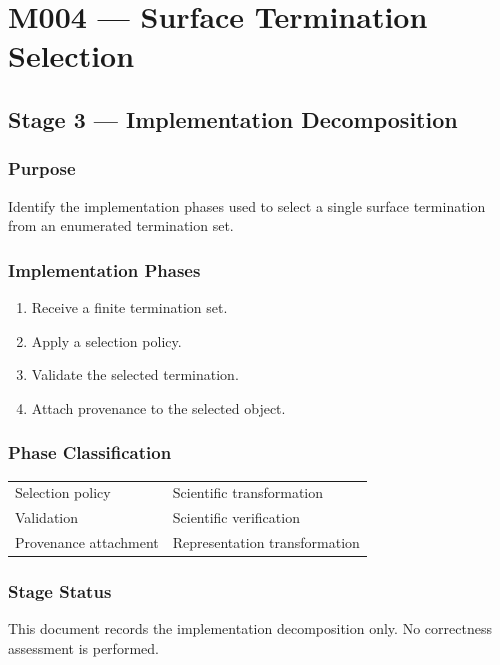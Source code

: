 \chapter{M004 --- Surface Termination Selection}

\section{Stage 3 --- Implementation Decomposition}

\subsection{Purpose}

Identify the implementation phases used to select a single surface
termination from an enumerated termination set.

\subsection{Implementation Phases}

\begin{enumerate}
\item Receive a finite termination set.
\item Apply a selection policy.
\item Validate the selected termination.
\item Attach provenance to the selected object.
\end{enumerate}

\subsection{Phase Classification}

\begin{tabular}{ll}
Selection policy & Scientific transformation\\
Validation & Scientific verification\\
Provenance attachment & Representation transformation\\
\end{tabular}

\subsection{Stage Status}

This document records the implementation decomposition only. No
correctness assessment is performed.
